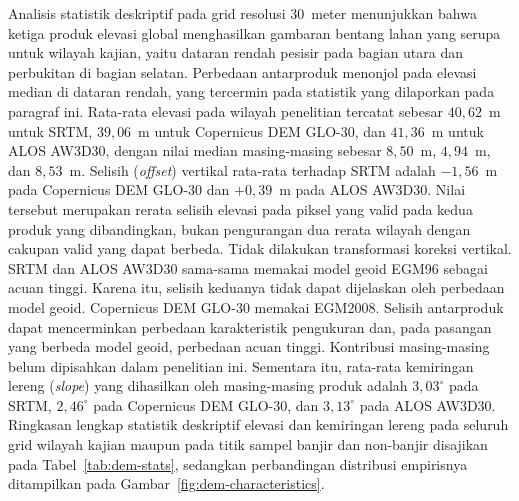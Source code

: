 \documentclass[12pt]{article}
\begin{document}
Analisis statistik deskriptif pada grid resolusi 30~meter menunjukkan bahwa
ketiga produk elevasi global menghasilkan gambaran bentang lahan yang serupa
untuk wilayah kajian, yaitu dataran rendah pesisir pada bagian utara dan
perbukitan di bagian selatan. Perbedaan antarproduk menonjol pada elevasi
median di dataran rendah, yang tercermin pada statistik yang dilaporkan pada
paragraf ini.
Rata-rata elevasi pada wilayah penelitian tercatat sebesar $40{,}62$~m untuk
SRTM, $39{,}06$~m untuk Copernicus DEM GLO-30, dan $41{,}36$~m untuk ALOS
AW3D30, dengan nilai median masing-masing sebesar $8{,}50$~m, $4{,}94$~m, dan
$8{,}53$~m. Selisih (\textit{offset}) vertikal rata-rata terhadap SRTM adalah
$-1{,}56$~m pada Copernicus DEM GLO-30 dan $+0{,}39$~m pada ALOS AW3D30. Nilai
tersebut merupakan rerata selisih elevasi pada piksel yang valid pada
kedua produk yang dibandingkan, bukan pengurangan dua rerata wilayah
dengan cakupan valid yang dapat berbeda. Tidak dilakukan transformasi
koreksi vertikal. SRTM dan ALOS AW3D30 sama-sama memakai model geoid EGM96
sebagai acuan tinggi. Karena itu, selisih keduanya tidak dapat dijelaskan
oleh perbedaan model geoid. Copernicus DEM GLO-30 memakai EGM2008.
Selisih antarproduk dapat mencerminkan perbedaan karakteristik pengukuran
dan, pada pasangan yang berbeda model geoid, perbedaan acuan tinggi.
Kontribusi masing-masing belum dipisahkan dalam penelitian ini.
Sementara itu, rata-rata
kemiringan lereng (\textit{slope}) yang dihasilkan oleh masing-masing produk
adalah $3{,}03^{\circ}$ pada SRTM, $2{,}46^{\circ}$ pada Copernicus DEM GLO-30,
dan $3{,}13^{\circ}$ pada ALOS AW3D30. Ringkasan lengkap statistik deskriptif
elevasi dan kemiringan lereng pada seluruh grid wilayah kajian maupun pada titik
sampel banjir dan non-banjir disajikan pada Tabel~\ref{tab:dem-stats}, sedangkan
perbandingan distribusi empirisnya ditampilkan pada Gambar~\ref{fig:dem-characteristics}.
\end{document}
